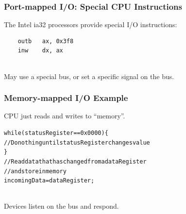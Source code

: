 \begin{frame}[fragile]
\frametitle{Port-mapped I/O: Special CPU Instructions}

\begin{changemargin}{1cm}
The Intel ia32 processors provide special I/O instructions:\\[1em]
\begin{verbatim}
    outb   ax, 0x3f8
    inw    dx, ax
\end{verbatim}
~\\
May use a special bus, or set a specific signal on the bus.
\end{changemargin}

\end{frame}


\begin{frame}
\frametitle{Memory-mapped I/O Example}

\begin{changemargin}{1cm}
CPU just reads and writes to ``memory''.\\[1em]
\end{changemargin}

\small
\begin{changemargin}{1em}
\begin{alltt}
 while (\alert{statusRegister} == 0x0000) \{\\
 \qquad // Do nothing until statusRegister changes value\\
 \}\\
 //  Read data that has changed from a dataRegister\\
 //  and store in memory\\
 incomingData = \alert{dataRegister};\\
\end{alltt}
\end{changemargin}

\begin{changemargin}{1cm}
~\\[1em] Devices listen on the bus and respond.
\end{changemargin}


\end{frame}


